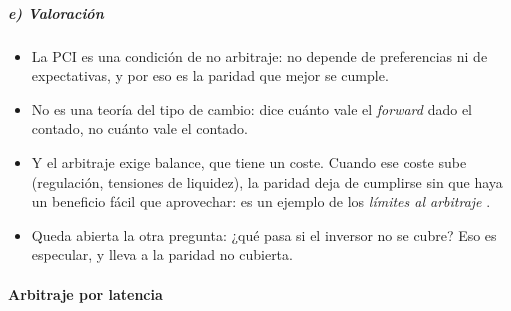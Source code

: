 \documentclass[11pt]{article}
\begin{document}
\subparagraph{e) Valoración}

\begin{itemize}
\item La PCI es una condición de no arbitraje: no depende de preferencias ni de expectativas, y por eso es la paridad que mejor se cumple.
\item No es una teoría del tipo de cambio: dice cuánto vale el \emph{forward} dado el contado, no cuánto vale el contado.
\item Y el arbitraje exige balance, que tiene un coste. Cuando ese coste sube (regulación, tensiones de liquidez), la paridad deja de cumplirse sin que haya un beneficio fácil que aprovechar: es un ejemplo de los \emph{límites al arbitraje}\nocite{ShleiferVishny1997Limits} .
\item Queda abierta la otra pregunta: ¿qué pasa si el inversor no se cubre? Eso es especular, y lleva a la paridad no cubierta.
\end{itemize}

\paragraph{Arbitraje por latencia}\label{sec:latencia}
\end{document}
